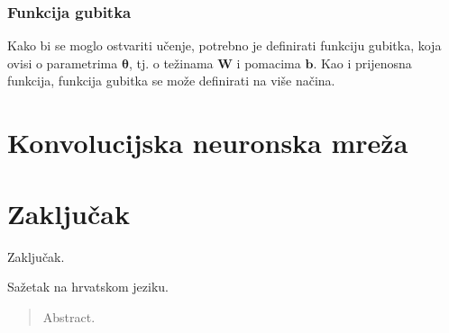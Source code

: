 \documentclass[times, utf8, zavrsni, numeric]{fer}
\renewcommand{\vec}[1]{\mathbf{#1}}
\begin{document}
\subsection{Funkcija gubitka}
Kako bi se moglo ostvariti učenje, potrebno je definirati funkciju gubitka,
koja ovisi o parametrima $\pmb{\theta}$, tj. o težinama $\vec{W}$ i pomacima
$\vec{b}$. Kao i prijenosna funkcija, funkcija gubitka se može definirati
na više načina.

\chapter{Konvolucijska neuronska mreža}

\chapter{Zaključak}
Zaključak.



\nocite{Cupic-UNN}
\nocite{Goodfellow-et-al-2016}


\begin{sazetak}
Sažetak na hrvatskom jeziku.

\end{sazetak}

\begin{abstract}
Abstract.

\end{abstract}
\end{document}
